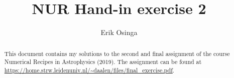 \documentclass[a4paper,10pt]{article}
\title{NUR Hand-in exercise 2}
\author{Erik Osinga}
\begin{document}
\maketitle

\begin{abstract}
This document contains my solutions to the second and final assignment of the course Numerical Recipes in Astrophysics (2019). The assignment can be found at \url{https://home.strw.leidenuniv.nl/~daalen/files/final_exercise.pdf}. 
\end{abstract}





\newpage


\newpage


\newpage


\newpage


\newpage


\newpage


\newpage
\printbibliography[heading=bibintoc]
\end{document}
